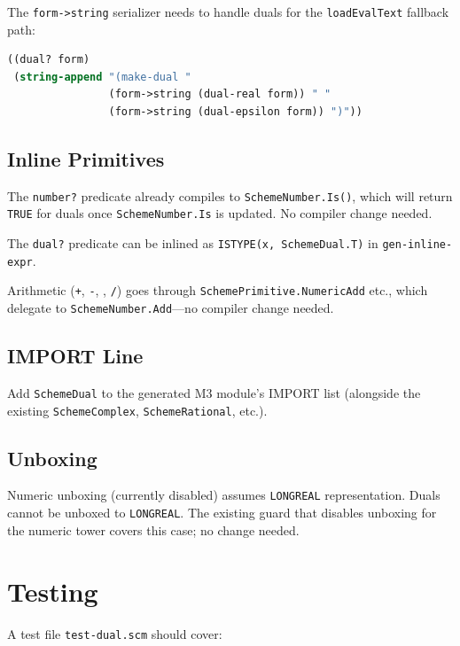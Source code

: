 \documentclass[12pt]{report}
\begin{document}
The {\tt form->string} serializer needs to handle duals for the
{\tt loadEvalText} fallback path:

\begin{lstlisting}[language=Scheme]
((dual? form)
 (string-append "(make-dual "
                (form->string (dual-real form)) " "
                (form->string (dual-epsilon form)) ")"))
\end{lstlisting}

\section{Inline Primitives}

The {\tt number?} predicate already compiles to
{\tt SchemeNumber.Is()}, which will return {\tt TRUE} for duals
once {\tt SchemeNumber.Is} is updated.  No compiler change needed.

The {\tt dual?} predicate can be inlined as
{\tt ISTYPE(x, SchemeDual.T)} in {\tt gen-inline-expr}.

Arithmetic ({\tt +}, {\tt -}, {\tt *}, {\tt /}) goes through
{\tt SchemePrimitive.NumericAdd} etc., which delegate to
{\tt SchemeNumber.Add}---no compiler change needed.

\section{IMPORT Line}

Add {\tt SchemeDual} to the generated M3 module's IMPORT list
(alongside the existing {\tt SchemeComplex}, {\tt SchemeRational},
etc.).

\section{Unboxing}

Numeric unboxing (currently disabled) assumes {\tt LONGREAL}
representation.  Duals cannot be unboxed to {\tt LONGREAL}.
The existing guard that disables unboxing for the numeric tower
covers this case; no change needed.

\chapter{Testing}

A test file {\tt test-dual.scm} should cover:
\end{document}
